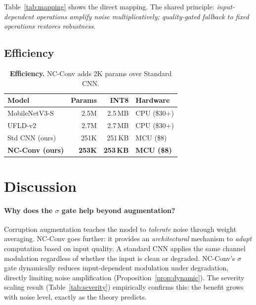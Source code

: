 \documentclass[10pt,twocolumn,letterpaper]{article}
\begin{document}
Table~\ref{tab:mapping} shows the direct mapping.
The shared principle: \emph{input-dependent operations amplify noise multiplicatively; quality-gated fallback to fixed operations restores robustness.}

\subsection{Efficiency}

\begin{table}[t]
\centering
\caption{\textbf{Efficiency.} NC-Conv adds 2K params over Standard CNN.}
\label{tab:efficiency}
\footnotesize
\begin{tabular}{@{}lrrl@{}}
\toprule
\textbf{Model} & \textbf{Params} & \textbf{INT8} & \textbf{Hardware} \\
\midrule
MobileNetV3-S & 2.5M & 2.5\,MB & CPU (\$30+) \\
UFLD-v2 & 2.7M & 2.7\,MB & CPU (\$30+) \\
\midrule
Std CNN (ours) & 251K & 251\,KB & MCU (\$8) \\
\textbf{NC-Conv (ours)} & \textbf{253K} & \textbf{253\,KB} & \textbf{MCU (\$8)} \\
\bottomrule
\end{tabular}
\end{table}


\section{Discussion}
\label{sec:discussion}

\paragraph{Why does the $\sigma$ gate help beyond augmentation?}
Corruption augmentation teaches the model to \emph{tolerate} noise through weight averaging.
NC-Conv goes further: it provides an \emph{architectural} mechanism to \emph{adapt} computation based on input quality.
A standard CNN applies the same channel modulation regardless of whether the input is clean or degraded.
NC-Conv's $\sigma$ gate dynamically reduces input-dependent modulation under degradation, directly limiting noise amplification (Proposition~\ref{prop:dynamic}).
The severity scaling result (Table~\ref{tab:severity}) empirically confirms this: the benefit grows with noise level, exactly as the theory predicts.
\end{document}
